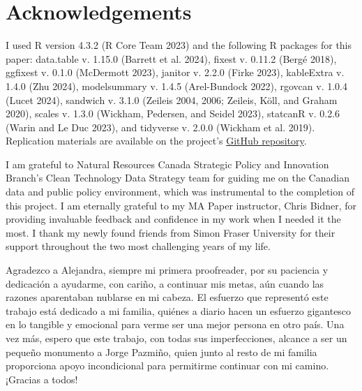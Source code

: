\documentclass[../main.tex]{subfiles}
\begin{document}
\section{Acknowledgements}
\label{sec:acknowledgements}

I used R version 4.3.2 (R Core Team 2023) and the following R packages for this paper: data.table v. 1.15.0 (Barrett et al. 2024), fixest v. 0.11.2 (Bergé 2018), ggfixest v. 0.1.0 (McDermott 2023), janitor v. 2.2.0 (Firke 2023), kableExtra v. 1.4.0 (Zhu 2024), modelsummary v. 1.4.5 (Arel-Bundock 2022), rgovcan v. 1.0.4 (Lucet 2024), sandwich v. 3.1.0 (Zeileis 2004, 2006; Zeileis, Köll, and Graham 2020), scales v. 1.3.0 (Wickham, Pedersen, and
Seidel 2023), statcanR v. 0.2.6 (Warin and Le Duc 2023), and tidyverse v. 2.0.0 (Wickham et al. 2019). Replication materials are available on the project's \href{https://github.com/dsanchezp18/econ899}{GitHub repository}.

I am grateful to Natural Resources Canada Strategic Policy and Innovation Branch's Clean Technology Data Strategy team for guiding me on the Canadian data and public policy environment, which was instrumental to the completion of this project. I am eternally grateful to my MA Paper instructor, Chris Bidner, for providing invaluable feedback and confidence in my work when I needed it the most. I thank my newly found friends from Simon Fraser University for their support throughout the two most challenging years of my life.

Agradezco a Alejandra, siempre mi primera proofreader, por su paciencia y dedicación a ayudarme, con cariño, a continuar mis metas, aún cuando las razones aparentaban nublarse en mi cabeza. El esfuerzo que representó este trabajo está dedicado a mi familia, quiénes a diario hacen un esfuerzo gigantesco en lo tangible y emocional para verme ser una mejor persona en otro país. Una vez más, espero que este trabajo, con todas sus imperfecciones, alcance a ser un pequeño monumento a Jorge Pazmiño, quien junto al resto de mi familia proporciona apoyo incondicional para permitirme continuar con mi camino. ¡Gracias a todos! %
\end{document}
